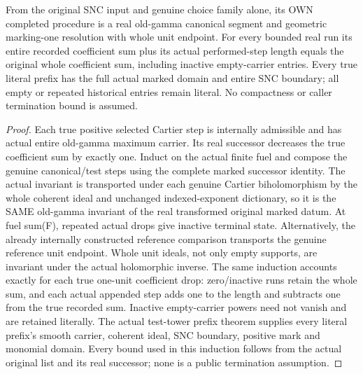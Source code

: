 \begin{theorem}
\label{hir:nc-ordered-choice-internal-finite-resolution}
\leanok
From the original SNC input and genuine choice family alone, its OWN completed
procedure is a real old-gamma canonical segment and geometric marking-one
resolution with whole unit endpoint. For every bounded real run its entire
recorded coefficient sum plus its actual performed-step length equals the
original whole coefficient sum, including inactive empty-carrier entries. Every true literal prefix has the full
actual marked domain and entire SNC boundary; all empty or repeated historical
entries remain literal. No compactness or caller termination bound is assumed.
\end{theorem}
\begin{proof}
Each true positive selected Cartier step is internally admissible and has
actual entire old-gamma maximum carrier. Its real successor decreases the
true coefficient sum by exactly one. Induct on the actual finite fuel and
compose the genuine canonical/test steps using the complete marked successor
identity. The actual invariant is transported under each genuine Cartier
biholomorphism by the whole coherent ideal and unchanged indexed-exponent
dictionary, so it is the SAME old-gamma invariant of the real transformed
original marked datum. At fuel sum(F), repeated actual drops give inactive
terminal state. Alternatively, the already internally constructed reference
comparison transports the genuine reference unit endpoint. Whole unit ideals,
not only empty supports, are invariant under the actual holomorphic inverse.
The same induction accounts exactly for each true one-unit coefficient drop:
zero/inactive runs retain the whole sum, and each actual appended step adds
one to the length and subtracts one from the true recorded sum. Inactive
empty-carrier powers need not vanish and are retained literally.
The actual test-tower prefix theorem supplies every literal prefix's smooth
carrier, coherent ideal, SNC boundary, positive mark and monomial domain.
Every bound used in this induction follows from the actual original list and
its real successor; none is a public termination assumption.
\end{proof}

